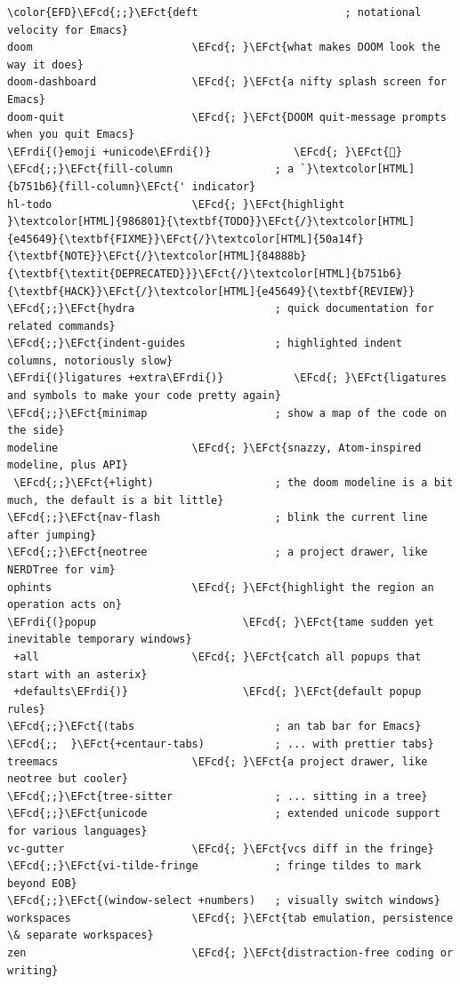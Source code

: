 \documentclass{scrartcl}
\newcommand{\EFct}[1]{\textcolor{EFct}{#1}} %
\newcommand{\EFcd}[1]{\textcolor{EFcd}{#1}} %
\newcommand{\EFrdi}[1]{\textcolor{EFrdi}{#1}} %
\begin{document}
\begin{enumerate}
\begin{Code}
\begin{Verbatim}[]
\color{EFD}\EFcd{;;}\EFct{deft                       ; notational velocity for Emacs}
doom                         \EFcd{; }\EFct{what makes DOOM look the way it does}
doom-dashboard               \EFcd{; }\EFct{a nifty splash screen for Emacs}
doom-quit                    \EFcd{; }\EFct{DOOM quit-message prompts when you quit Emacs}
\EFrdi{(}emoji +unicode\EFrdi{)}             \EFcd{; }\EFct{🙂}
\EFcd{;;}\EFct{fill-column                ; a `}\textcolor[HTML]{b751b6}{fill-column}\EFct{' indicator}
hl-todo                      \EFcd{; }\EFct{highlight }\textcolor[HTML]{986801}{\textbf{TODO}}\EFct{/}\textcolor[HTML]{e45649}{\textbf{FIXME}}\EFct{/}\textcolor[HTML]{50a14f}{\textbf{NOTE}}\EFct{/}\textcolor[HTML]{84888b}{\textbf{\textit{DEPRECATED}}}\EFct{/}\textcolor[HTML]{b751b6}{\textbf{HACK}}\EFct{/}\textcolor[HTML]{e45649}{\textbf{REVIEW}}
\EFcd{;;}\EFct{hydra                      ; quick documentation for related commands}
\EFcd{;;}\EFct{indent-guides              ; highlighted indent columns, notoriously slow}
\EFrdi{(}ligatures +extra\EFrdi{)}           \EFcd{; }\EFct{ligatures and symbols to make your code pretty again}
\EFcd{;;}\EFct{minimap                    ; show a map of the code on the side}
modeline                     \EFcd{; }\EFct{snazzy, Atom-inspired modeline, plus API}
 \EFcd{;;}\EFct{+light)                   ; the doom modeline is a bit much, the default is a bit little}
\EFcd{;;}\EFct{nav-flash                  ; blink the current line after jumping}
\EFcd{;;}\EFct{neotree                    ; a project drawer, like NERDTree for vim}
ophints                      \EFcd{; }\EFct{highlight the region an operation acts on}
\EFrdi{(}popup                       \EFcd{; }\EFct{tame sudden yet inevitable temporary windows}
 +all                        \EFcd{; }\EFct{catch all popups that start with an asterix}
 +defaults\EFrdi{)}                  \EFcd{; }\EFct{default popup rules}
\EFcd{;;}\EFct{(tabs                      ; an tab bar for Emacs}
\EFcd{;;  }\EFct{+centaur-tabs)           ; ... with prettier tabs}
treemacs                     \EFcd{; }\EFct{a project drawer, like neotree but cooler}
\EFcd{;;}\EFct{tree-sitter                ; ... sitting in a tree}
\EFcd{;;}\EFct{unicode                    ; extended unicode support for various languages}
vc-gutter                    \EFcd{; }\EFct{vcs diff in the fringe}
\EFcd{;;}\EFct{vi-tilde-fringe            ; fringe tildes to mark beyond EOB}
\EFcd{;;}\EFct{(window-select +numbers)   ; visually switch windows}
workspaces                   \EFcd{; }\EFct{tab emulation, persistence \& separate workspaces}
zen                          \EFcd{; }\EFct{distraction-free coding or writing}
\end{Verbatim}
\end{Code}


\end{enumerate}
\end{document}
